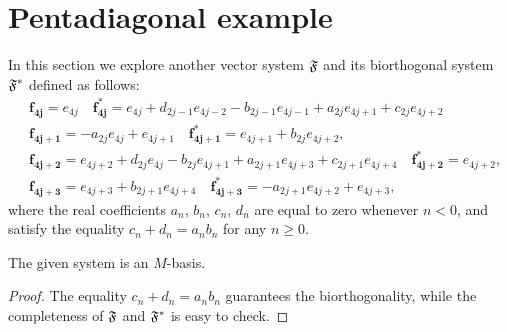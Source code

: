 \section{Pentadiagonal example}
  \label{section:pentadiagonal}
  In this section we explore another vector system $\mathfrak{F}$ and its biorthogonal system $\mathfrak{F^{*}}$ defined as follows:
  \begin{equation}
    \label{eq:5system}
    \begin{aligned}
      &\mathbf{f_{4j}} = e_{4j} \quad
      \mathbf{f^*_{4j}} = e_{4j} + d_{2j - 1} e_{4j-2} - b_{2j-1} e_{4j-1} + a_{2j} e_{4j+1} + c_{2j} e_{4j+2}\\
      &\mathbf{f_{4j+1}} = -a_{2j} e_{4j} + e_{4j+1} \quad
      \mathbf{f^*_{4j+1}} = e_{4j+1} + b_{2j} e_{4j+2},\\
      &\mathbf{f_{4j+2}} = e_{4j+2} + d_{2j} e_{4j} - b_{2j} e_{4j+1} + a_{2j+1} e_{4j+3} + c_{2j+1} e_{4j+4}\quad
      \mathbf{f^*_{4j+2}} = e_{4j+2},\\
      &\mathbf{f_{4j+3}} = e_{4j+3} + b_{2j+1} e_{4j+4}\quad
      \mathbf{f^*_{4j+3}} = -a_{2j+1} e_{4j+2} + e_{4j+3},
    \end{aligned}
  \end{equation}
    where the real coefficients $a_n$, $b_n$, $c_n$, $d_n$ are equal to zero whenever $n < 0$, and satisfy the equality
      $c_n + d_n = a_n b_n$ for any $n \geq 0$.
  \begin{prop}
    The given system is an $M$-basis.
  \end{prop}
  \begin{proof}
    The equality $c_n + d_n = a_n b_n$ guarantees the bi\-orthogonality,
      while the completeness of $\mathfrak{F}$ and $\mathfrak{F^{*}}$ is easy to check.
  \end{proof}

